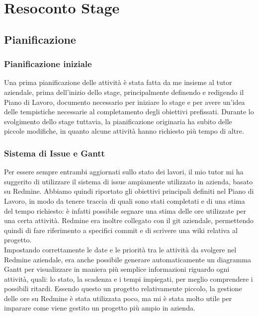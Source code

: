 
\chapter{Resoconto Stage}
\label{cap:resoconto-stage}

\section{Pianificazione}
\subsection{Pianificazione iniziale}\label{sec:pianificazione-iniziale}
Una prima pianificazione delle attività è stata fatta da me insieme al tutor aziendale, prima dell'inizio dello stage, principalmente definendo e redigendo il Piano di Lavoro, documento necessario per iniziare lo stage e per avere un'idea delle tempistiche necessarie al completamento degli obiettivi prefissati. Durante lo svolgimento dello stage tuttavia, la pianificazione originaria ha subito delle piccole modifiche, in quanto alcune attività hanno richiesto più tempo di altre. 

\subsection{Sistema di Issue e Gantt}
Per essere sempre entrambi aggiornati sullo stato dei lavori, il mio tutor mi ha suggerito di utilizzare il sistema di issue ampiamente utilizzato in azienda, basato su Redmine. Abbiamo quindi riportato gli obiettivi principali definiti nel Piano di Lavoro, in modo da tenere traccia di quali sono stati completati e di una stima del tempo richiesto: è infatti possibile segnare una stima delle ore utilizzate per una certa attività. Redmine era inoltre collegato con il git aziendale, permettendo quindi di fare riferimento a specifici commit e di scrivere una wiki relativa al progetto.
\\
Impostando correttamente le date e le priorità tra le attività da svolgere nel Redmine aziendale, era anche possibile generare automaticamente un diagramma Gantt per visualizzare in maniera più semplice informazioni riguardo ogni attività, quali: lo stato, la scadenza e i tempi impiegati, per meglio comprendere i possibili ritardi. Essendo questo un progetto relativamente piccolo, la gestione delle ore su Redmine è stata utilizzata poco, ma mi è stata molto utile per imparare come viene gestito un progetto più ampio in azienda.

